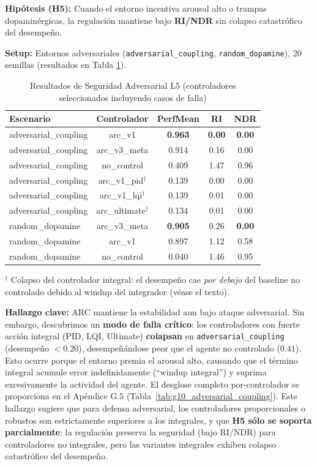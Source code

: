 \documentclass{article}
\begin{document}
\textbf{Hipótesis (H5):} Cuando el entorno incentiva arousal alto o trampas dopaminérgicas, la regulación mantiene bajo \textbf{RI/NDR} sin colapso catastrófico del desempeño.

\textbf{Setup:} Entornos adversariales (\texttt{adversarial\_coupling}, \texttt{random\_dopamine}), 20 semillas (resultados en Tabla \ref{tab:l5_results}).

\begin{table}[htbp]
\centering
\caption{Resultados de Seguridad Adversarial L5 (controladores seleccionados incluyendo casos de falla)}
\label{tab:l5_results}
\begin{tabular}{@{}lcccc@{}}
\toprule
Escenario & Controlador & PerfMean & RI & NDR \\ \midrule
adversarial\_coupling & arc\_v1 & \textbf{0.963} & \textbf{0.00} & \textbf{0.00} \\
adversarial\_coupling & arc\_v3\_meta & 0.914 & 0.16 & 0.00 \\
adversarial\_coupling & no\_control & 0.409 & 1.47 & 0.96 \\
adversarial\_coupling & arc\_v1\_pid$^\dagger$ & 0.139 & 0.00 & 0.00 \\
adversarial\_coupling & arc\_v1\_lqi$^\dagger$ & 0.139 & 0.01 & 0.00 \\
adversarial\_coupling & arc\_ultimate$^\dagger$ & 0.134 & 0.01 & 0.00 \\
\midrule
random\_dopamine & arc\_v3\_meta & \textbf{0.905} & 0.26 & \textbf{0.00} \\
random\_dopamine & arc\_v1 & 0.897 & 1.12 & 0.58 \\
random\_dopamine & no\_control & 0.040 & 1.46 & 0.95 \\ \bottomrule
\end{tabular}

\vspace{0.5em}
\footnotesize{$^\dagger$ Colapso del controlador integral: el desempeño cae \textit{por debajo} del baseline no controlado debido al windup del integrador (véase el texto).}
\end{table}

\textbf{Hallazgo clave:} ARC mantiene la estabilidad aun bajo ataque adversarial. Sin embargo, descubrimos un \textbf{modo de falla crítico}: los controladores con fuerte acción integral (PID, LQI, Ultimate) \textbf{colapsan} en \texttt{adversarial\_coupling} (desempeño $< 0.20$), desempeñándose peor que el agente no controlado (0.41). Esto ocurre porque el entorno premia el arousal alto, causando que el término integral acumule error indefinidamente (``windup integral'') y suprima excesivamente la actividad del agente. El desglose completo por-controlador se proporciona en el Apéndice G.5 (Tabla~\ref{tab:g10_adversarial_coupling}). Este hallazgo sugiere que para defensa adversarial, los controladores proporcionales o robustos son estrictamente superiores a los integrales, y que \textbf{H5 sólo se soporta parcialmente}: la regulación preserva la seguridad (bajo RI/NDR) para controladores no integrales, pero las variantes integrales exhiben colapso catastrófico del desempeño.
\end{document}
